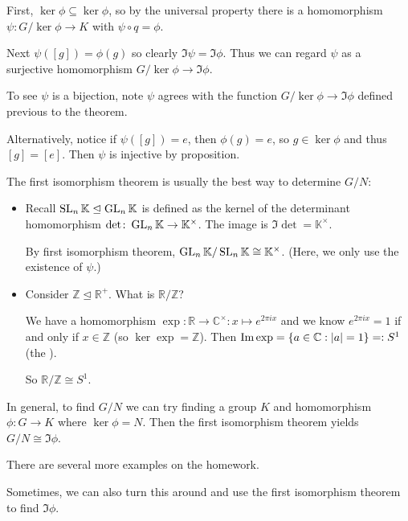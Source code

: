 \documentclass[12pt,letterpaper]{report}
\begin{document}
\begin{thmproof}
  First, $\ker\phi \subseteq \ker\phi$, so by the universal property there is a homomorphism
  $\psi \colon G/\ker\phi \to K$ with $\psi \circ q = \phi$.

  Next $\psi([g]) = \phi(g)$ so clearly $\Im\psi = \Im\phi$.
  Thus we can regard $\psi$ as a surjective homomorphism $G/\ker\phi \to \Im\phi$.

  To see $\psi$ is a bijection, note $\psi$ agrees with the function $G/\ker\phi \to \Im\phi$
  defined previous to the theorem.

  Alternatively, notice if $\psi([g]) = e$, then $\phi(g) = e$, so $g \in \ker\phi$ and thus
  $[g] = [e]$.
  Then $\psi$ is injective by proposition.
\end{thmproof}

\begin{ex}
  The first isomorphism theorem is usually the best way to determine $G/N$:
  \begin{itemize}
    \item
    Recall $\operatorname{SL}_n\mathbb{K} \trianglelefteq \operatorname{GL}_n\mathbb{K}$ is defined as the kernel of the
    determinant homomorphism $\det \colon \operatorname{GL}_n\mathbb{K} \to \mathbb{K}^\times$.
    The image is $\Im\det = \mathbb{K}^\times$.

    By first isomorphism theorem, $\operatorname{GL}_n\mathbb{K} / \operatorname{SL}_n\mathbb{K} \cong \mathbb{K}^\times$.
    (Here, we only use the existence of $\psi$.)
    \item
    Consider $\mathbb{Z} \trianglelefteq \mathbb{R}^+$.
    What is $\mathbb{R}/\mathbb{Z}$?

    We have a homomorphism $\exp \colon \mathbb{R} \to \mathbb{C}^\times : x \mapsto e^{2\pi ix}$
    and we know $e^{2\pi ix} = 1$ if and only if $x \in \mathbb{Z}$ (so $\ker\exp = \mathbb{Z}$).
    Then $\operatorname{Im}\exp = \{a \in \mathbb{C} : \lvert a\rvert = 1\} =: S^1$ (the ).

    So $\mathbb{R}/\mathbb{Z} \cong S^1$.
  \end{itemize}
\end{ex}

In general, to find $G/N$ we can try finding a group $K$ and homomorphism $\phi \colon G \to K$
where $\ker\phi = N$.
Then the first isomorphism theorem yields $G/N \cong \Im\phi$.

There are several more examples on the homework.

Sometimes, we can also turn this around and use the first isomorphism theorem to find $\Im\phi$.
\end{document}
